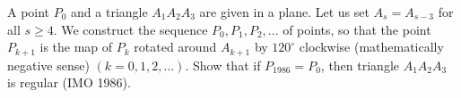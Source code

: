 A point $P_0$ and a triangle $A_1A_2A_3$ are given in a plane. Let us set $A_s = A_{s-3}$ for all $s \geq 4$. We construct the sequence $P_0, P_1, P_2, \ldots$ of points, so that the point $P_{k+1}$ is the map of $P_k$ rotated around $A_{k+1}$ by $120^\circ$ clockwise (mathematically negative sense) $(k = 0, 1, 2, \ldots)$. Show that if $P_{1986} = P_0$, then triangle $A_1A_2A_3$ is regular (IMO 1986).
